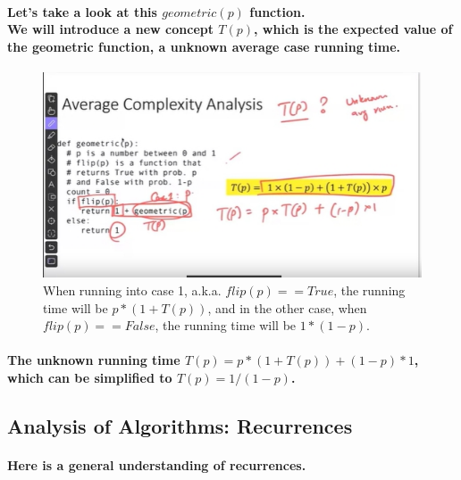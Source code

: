 \documentclass{article}
\begin{document}
\paragraph{Let's take a look at this $geometric(p)$ function.\\
We will introduce a new concept $T(p)$, which is the expected value of the geometric function, 
a unknown average case running time.\\}


\begin{figure}[h]
    \includegraphics[width=\textwidth]{averagerunningtimetp.png}
    \caption{When running into case 1, a.k.a. $flip(p) == True$, the running time will be
    $p*(1+T(p))$, and in the other case, when $flip(p) == False$, the running time will be
    $1*(1-p)$.}
\end{figure}

\paragraph{
    The unknown running time $T(p) = p*(1+T(p)) + (1-p)*1$, which can be simplified to $T(p) = 1/(1-p)$.\\
}

\subsection{Analysis of Algorithms: Recurrences}

\paragraph{Here is a general understanding of recurrences.\\}
\end{document}
